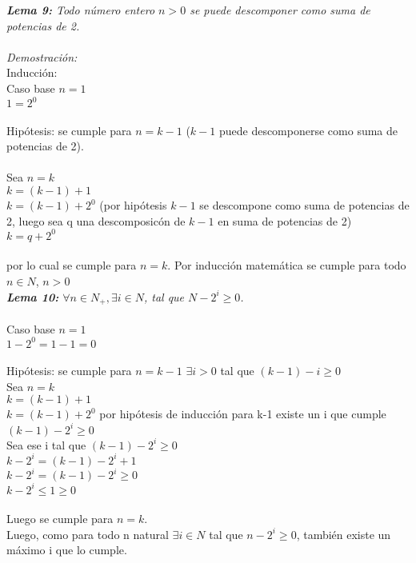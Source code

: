 \documentclass[12pt]{article}
\begin{document}
\textit{ \textbf{Lema 9:} Todo n\'umero entero $n > 0$ se puede descomponer como suma de potencias de 2.}\\
\\
\textit{Demostración:}\\
Inducci\'on:\\
Caso base $n = 1$ \\
          $1 = 2^0$\\
\\
Hip\'otesis: se cumple para $n = k - 1$ ($k - 1$ puede descomponerse como suma de potencias de 2).\\
\\
Sea $n = k$\\
    $k = (k-1) + 1$\\
    $k = (k-1) + 2^0$ (por hip\'otesis $k-1$ se descompone como suma de potencias de 2, luego sea q una descomposic\'on de $k-1$ en suma de potencias de 2)\\
    $k = q + 2^0$\\
\\
por lo cual se cumple para $n = k$. Por inducci\'on matem\'atica se cumple para todo $n \in N$, $n > 0$\\



\textit{ \textbf{Lema 10:} $\forall n\in N_+ ,\exists i \in N$, tal que $N - 2^i \geq 0$.}\\
\\
Caso base $n = 1$\\
          $1 - 2^0 = 1 - 1 = 0$\\
\\
Hip\'otesis: se cumple para $n = k- 1$ $\exists i > 0$ tal que $(k - 1) - i \geq 0$\\
Sea $n = k$\\
    $k = (k-1) + 1$\\
    $k = (k-1) + 2^0$ por hip\'otesis de inducci\'on para k-1 existe un i que cumple $(k-1) - 2^i \geq 0$\\
Sea ese i tal que $(k-1) - 2^i \geq 0$\\
                   $k - 2^i = (k - 1) - 2^i + 1$\\            
                   $k - 2^i = (k-1) - 2^i \geq 0$\\
                   $k - 2^i \leq 1 \geq 0$\\
\\
Luego se cumple para $n = k$.\\


Luego, como para todo n natural $ \exists i \in N$ tal que $n - 2^i \geq 0$, tambi\'en existe un m\'aximo i que lo cumple.\\
\\	
\end{document}

